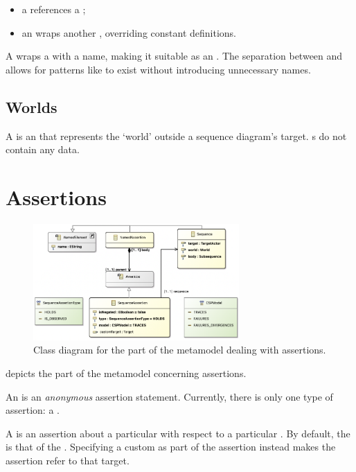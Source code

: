 \begin{itemize}
\item
	a \mrcmoduletarget{} references a \mrcmodule;
\item
	an \moverridetarget{} wraps another \mtarget, overriding constant
	definitions.
\end{itemize}

A \mtargetactor{} wraps a \mtarget{} with a name, making it suitable as an
\mactor.  The separation between \mtarget{} and \mtargetactor{} allows for
patterns like \moverridetarget{} to exist without introducing unnecessary names.

\subsection{Worlds}\label{ssec:metamodel-actors-world}

A \mworld{} is an \mactor{} that represents the `world' outside a sequence
diagram's target.  \mworld s do not contain any data.

\section{Assertions}\label{sec:metamodel-assertions}

\begin{figure}
	\centering
	\includegraphics[width=0.7\textwidth]{diagrams/assertions.png}
	\caption{Class diagram for the part of the \langname{} metamodel dealing with assertions.}
	\label{fig:metamodel-assertions}
\end{figure}

 depicts the part of the metamodel concerning
assertions.

An \massertion{} is an \emph{anonymous} assertion statement.  Currently, there is
only one type of assertion: a \msequenceassertion{}.  

A \msequenceassertion{} is an assertion about a particular \msequence{} with
respect to a particular \mtarget.  By default, the \mtarget{} is that of the
\msequence{}.   Specifying a
custom \mtarget{} as part of the assertion instead makes the assertion refer
to that target.

